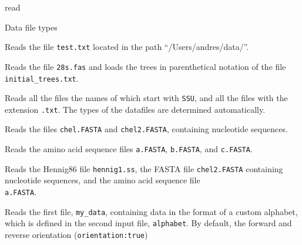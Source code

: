 \begin{command}{read}{}
\begin{arguments}
\begin{argumentgroup}{Data file types}
	\end{argumentgroup}
		
	\end{arguments}


	\begin{poyexamples}
	
            {Reads the file \texttt{test.txt} located in the path
            ``/Users/andres/data/''.}

            {Reads the file \texttt{28s.fas} and loads the trees in parenthetical notation
            of the file \texttt{initial\_trees.txt}.}

            {Reads all the files the names of which start with \texttt{SSU}, and all the
            files with the extension \texttt{.txt}. The types of the datafiles are determined
            automatically.}
        
            {Reads the files \texttt{chel.FASTA} and \texttt{chel2.FASTA}, containing nucleotide
            sequences.}

            {Reads the amino acid sequence files \texttt{a.FASTA}, \texttt{b.FASTA}, and
            \texttt{c.FASTA}.}

            {Reads the Hennig86 file \texttt{hennig1.ss}, the FASTA file \texttt{chel2.FASTA}
            containing nucleotide sequences, and the amino acid
            sequence file \\ \texttt{a.FASTA}.}
            
        {Reads the first file, \texttt{my\_data}, containing data in the format of a custom
        alphabet, which is defined in the second input file, \texttt{alphabet}. By default, the
        forward and reverse orientation (\texttt{orientation:true})} 
            

\end{poyexamples}
\end{command}
